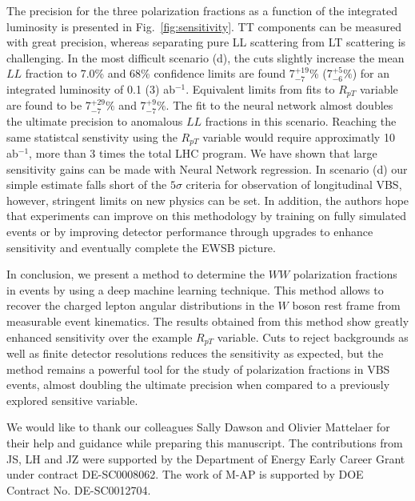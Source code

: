 The precision for the three polarization fractions as a function of the integrated luminosity is presented in Fig.~\ref{fig:sensitivity}. 
 TT components can be measured with great precision, whereas separating pure LL scattering from LT scattering is challenging.
In the most difficult scenario (d), the cuts slightly increase the mean $LL$ fraction to 7.0\% and 68\% confidence limits are found 7$^{+19}_{-7}$\% (7$^{+5}_{-6}\%$) for an integrated luminosity of 0.1 (3) ab$^{-1}$.  Equivalent limits from fits to $R_{pT}$ variable are found to be 7$^{+29}_{-7}\%$ and 7$^{+9}_{-7}\%$. The fit to the neural network almost doubles the ultimate precision to anomalous $LL$ fractions in this scenario. Reaching the same statistcal senstivity using the $R_{pT}$ variable would require approximatly 10 ab$^{-1}$, more than 3 times the total LHC program. We have shown that large sensitivity gains can be made with Neural Network regression. In scenario (d) our simple estimate falls short of the $5\sigma$ criteria for observation of longitudinal VBS, however, stringent limits on new physics can be set. In addition, the authors hope that experiments can improve on this methodology by training on fully simulated events or by improving detector performance through upgrades to enhance sensitivity and eventually complete the EWSB picture. 

In conclusion, we present a method to determine the $WW$ polarization fractions in
\ssWW events by using a deep machine learning technique.  This method
allows to recover the charged lepton angular distributions in the $W$
boson rest frame from measurable event kinematics.  The
results obtained from this method show greatly enhanced sensitivity over
the example $R_{pT}$ variable.  Cuts to reject
backgrounds as well as finite detector resolutions reduces the sensitivity as
expected, but the method remains a powerful tool for the study of
polarization fractions in VBS events, almost doubling the ultimate precision when compared to a previously explored sensitive variable.

We would like to thank our colleagues Sally Dawson and Olivier Mattelaer for their help and guidance while preparing this manuscript.
The contributions from JS, LH and JZ were supported by the Department of Energy Early Career Grant under contract DE-SC0008062. The work of M-AP is supported by DOE Contract No. DE-SC0012704. 




